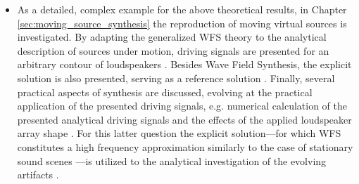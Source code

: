 \begin{itemize}
%
\item As a detailed, complex example for the above theoretical results, in Chapter \ref{sec:moving_source_synthesis} the reproduction of moving virtual sources is investigated.
By adapting the generalized WFS theory to the analytical description of sources under motion, driving signals are presented for an arbitrary contour of loudspeakers \cite{Firtha2015:daga, firtha2016wave, doi:10.1121/1.4996126}.
Besides Wave Field Synthesis, the explicit solution is also presented, serving as a reference solution \cite{Firtha2014:daga, Firtha2014:isma}.
Finally, several practical aspects of synthesis are discussed, evolving at the practical application of the presented driving signals, e.g. numerical calculation of the presented analytical driving signals and the effects of the applied loudspeaker array shape \cite{Firtha2018_daga_moving_source}.
For this latter question the explicit solution---for which WFS constitutes a high frequency approximation similarly to the case of stationary sound scenes \cite{firtha2015sound}---is utilized to the analytical investigation of the evolving artifacts \cite{firtha2016:daga}.
\end{itemize}